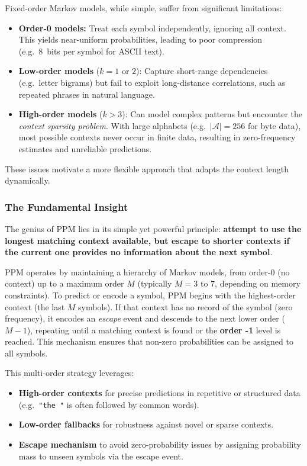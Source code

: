 Fixed-order Markov models, while simple, suffer from significant limitations:
\begin{itemize}
    \item \textbf{Order-0 models:} Treat each symbol independently, ignoring all
          context. This yields near-uniform probabilities, leading to poor compression
          (e.g.\ 8~bits per symbol for ASCII text).
    \item \textbf{Low-order models} ($k = 1$ or $2$): Capture short-range dependencies
          (e.g.\ letter bigrams) but fail to exploit long-distance correlations, such as
          repeated phrases in natural language.
    \item \textbf{High-order models} ($k > 3$): Can model complex patterns but encounter
          the \textit{context sparsity problem}. With large alphabets
          (e.g.\ $|\mathcal{A}| = 256$ for byte data), most possible contexts never
          occur in finite data, resulting in zero-frequency estimates and unreliable
          predictions.
\end{itemize}

These issues motivate a more flexible approach that adapts the context length
dynamically.

\subsubsection{The Fundamental Insight}

The genius of PPM lies in its simple yet powerful principle: \textbf{attempt to use
the longest matching context available, but escape to shorter contexts if the current
one provides no information about the next symbol}.

\begin{importantbox}
PPM operates by maintaining a hierarchy of Markov models, from order-0 (no context)
up to a maximum order $M$ (typically $M = 3$ to $7$, depending on memory
constraints). To predict or encode a symbol, PPM begins with the highest-order
context (the last $M$ symbols). If that context has no record of the symbol (zero
frequency), it encodes an \textit{escape} event and descends to the next lower order
($M-1$), repeating until a matching context is found or the \textbf{order -1} level is reached. This mechanism ensures that non-zero probabilities can be assigned to all symbols.
\end{importantbox}

This multi-order strategy leverages:
\begin{itemize}
    \item \textbf{High-order contexts} for precise predictions in repetitive or
          structured data (e.g.\ \texttt{"the "} is often followed by common words).
    \item \textbf{Low-order fallbacks} for robustness against novel or sparse contexts.
    \item \textbf{Escape mechanism} to avoid zero-probability issues by assigning probability mass to unseen symbols via the escape event.
\end{itemize}

